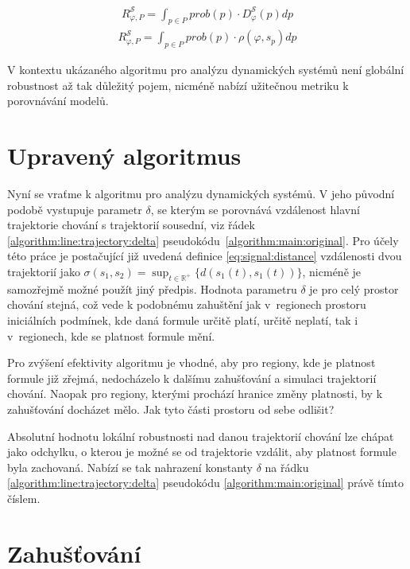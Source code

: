 \begin{align}
R_{\varphi, P}^\mathcal{S} = {\displaystyle\int_{p \in P}}prob(p) \cdot D_\varphi^\mathcal{S}(p)dp\label{eq:global:robustness:general}
\end{align}
\begin{align}
R_{\varphi, P}^\mathcal{S} = {\displaystyle\int_{p \in P}}prob(p) \cdot \rho(\varphi, s_p)dp\label{eq:global:robustness:concrete}
\end{align}

V kontextu ukázaného algoritmu pro analýzu dynamických systémů není globální robustnost až tak
důležitý pojem, nicméně nabízí užitečnou metriku k porovnávání modelů.

\section{Upravený algoritmus}\label{section:algorithm:updated}

Nyní se vraťme k algoritmu pro analýzu dynamických systémů. V jeho původní podobě
vystupuje parametr $\delta$, se kterým se porovnává vzdálenost hlavní trajektorie chování
s trajektorií sousední, viz řádek \ref{algorithm:line:trajectory:delta}
pseudokódu~\ref{algorithm:main:original}. Pro účely této práce je postačující již uvedená
definice \ref{eq:signal:distance} vzdálenosti dvou trajektorií jako $\sigma(s_1, s_2) = {\displaystyle \sup_{t \in \mathbb{R}^{+}}} \{d(s_1(t), s_1(t))\}$,
nicméně je samozřejmě mož\-né použít jiný předpis. Hodnota parametru $\delta$ je pro celý prostor
chování stejná, což vede k podobnému zahuštění jak v~regionech prostoru iniciálních pod\-mí\-nek,
kde daná formule určitě platí, určitě neplatí, tak i v~regionech, kde se platnost formule mění.

Pro zvýšení efektivity algoritmu je vhodné, aby pro regiony, kde je platnost formule již zřejmá,
nedocházelo k dalšímu zahušťování a simulaci trajektorií chování. Naopak pro regiony, kterými prochází
hranice změny platnosti, by k zahušťování docházet mělo. Jak tyto části prostoru od sebe odlišit?

Absolutní hodnotu lokální robustnosti nad danou trajektorií chování lze chápat
jako odchylku, o kterou je možné se od trajektorie vzdálit, aby platnost
formule byla zachovaná. Nabízí se tak nahrazení konstanty $\delta$ na řádku \ref{algorithm:line:trajectory:delta} pseudokódu \ref{algorithm:main:original}
právě tímto číslem.

\section{Zahušťování}


